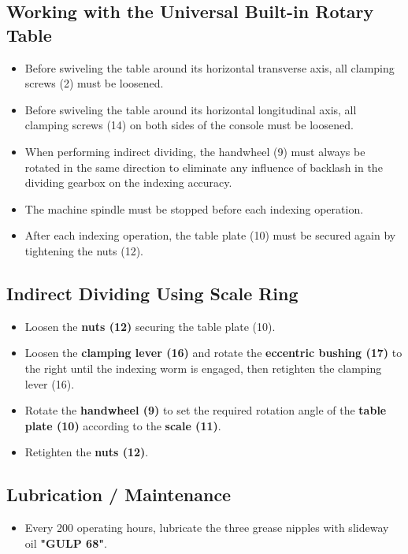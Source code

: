 \subsection*{Working with the Universal Built-in Rotary Table}
\begin{itemize}
    \item Before swiveling the table around its horizontal transverse axis, all clamping screws (2) must be loosened.
    \item Before swiveling the table around its horizontal longitudinal axis, all clamping screws (14) on both sides of the console must be loosened.
    \item When performing indirect dividing, the handwheel (9) must always be rotated in the same direction to eliminate any influence of backlash in the dividing gearbox on the indexing accuracy.
    \item The machine spindle must be stopped before each indexing operation.
    \item After each indexing operation, the table plate (10) must be secured again by tightening the nuts (12).
\end{itemize}

\newpage
\subsection*{Indirect Dividing Using Scale Ring}

\begin{itemize}
    \item Loosen the \textbf{nuts (12)} securing the table plate (10).
    \item Loosen the \textbf{clamping lever (16)} and rotate the \textbf{eccentric bushing (17)} to the right until the indexing worm is engaged, then retighten the clamping lever (16).
    \item Rotate the \textbf{handwheel (9)} to set the required rotation angle of the \textbf{table plate (10)} according to the \textbf{scale (11)}.
    \item Retighten the \textbf{nuts (12)}.
\end{itemize}


\subsection*{Lubrication / Maintenance}
\begin{itemize}
    \item Every 200 operating hours, lubricate the three grease nipples with slideway oil \textbf{"GULP 68"}.
\end{itemize}

